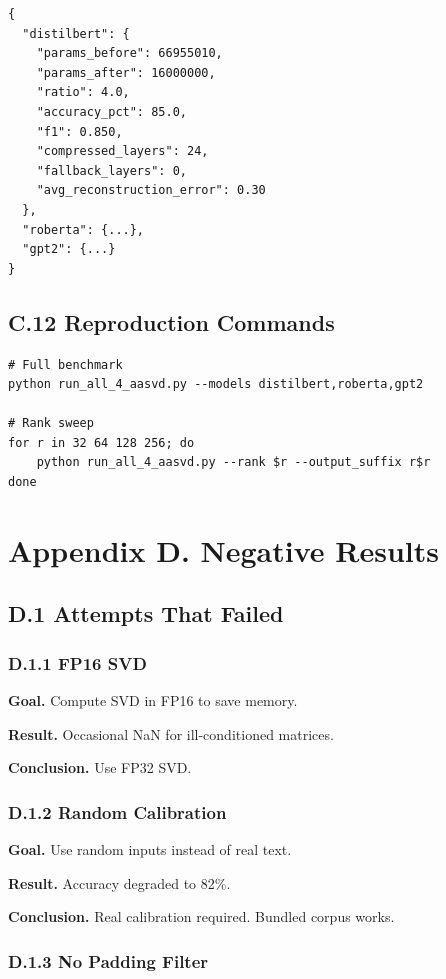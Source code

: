 \begin{lstlisting}
{
  "distilbert": {
    "params_before": 66955010,
    "params_after": 16000000,
    "ratio": 4.0,
    "accuracy_pct": 85.0,
    "f1": 0.850,
    "compressed_layers": 24,
    "fallback_layers": 0,
    "avg_reconstruction_error": 0.30
  },
  "roberta": {...},
  "gpt2": {...}
}
\end{lstlisting}

\subsection{C.12 Reproduction Commands}

\begin{lstlisting}
# Full benchmark
python run_all_4_aasvd.py --models distilbert,roberta,gpt2

# Rank sweep
for r in 32 64 128 256; do
    python run_all_4_aasvd.py --rank $r --output_suffix r$r
done
\end{lstlisting}


\section{Appendix D. Negative Results}

\subsection{D.1 Attempts That Failed}

\subsubsection{D.1.1 FP16 SVD}

\textbf{Goal.} Compute SVD in FP16 to save memory.

\textbf{Result.} Occasional NaN for ill-conditioned matrices.

\textbf{Conclusion.} Use FP32 SVD.

\subsubsection{D.1.2 Random Calibration}

\textbf{Goal.} Use random inputs instead of real text.

\textbf{Result.} Accuracy degraded to 82\%.

\textbf{Conclusion.} Real calibration required. Bundled corpus works.

\subsubsection{D.1.3 No Padding Filter}

